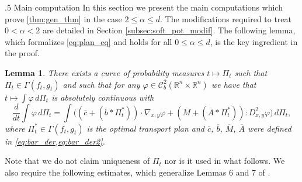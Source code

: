 \documentclass[10pt,oneside]{amsart}
\makeatletter
\def\subsection{\@startsection{subsection}{2}%
  \z@{.5\linespacing\@plus.7\linespacing}
{.5\baselineskip}%
  {\normalfont\centering\scshape}%
}
\numberwithin{equation}{section}
\numberwithin{definition}{section}
\numberwithin{theorem}{section}
\newtheorem{lemma}{Lemma}
\numberwithin{lemma}{section}
\makeatother
\begin{document}
\subsection{Main computation}\label{subsec:main_comput}
In this section we present the main computations which prove \cref{thm:gen_thm} in the case $2\leq \alpha\leq d$. The modifications required to treat $0<\alpha <2$ are detailed in Section \ref{subsec:soft_pot_modif}. The following lemma, which formalizes \cref{eq:plan_eq} and holds for all $0\leq \alpha \leq d$, is the key ingredient in the proof.
% 
\begin{lemma}\label{lem:existence_plan}
  There exists a curve of probability measures $t\mapsto \Pi_t$ such that $\Pi_t\in \Gamma(f_t,g_t)$ and such that for any $\varphi \in \mathcal C^2_b(\mathbb R^n\times \mathbb R^n)$ we have that $t\mapsto \int \varphi\,d\Pi_t$ is absolutely continuous with
  \begin{equation*}
    \frac{d}{dt}\int\varphi\,d\Pi_{t} = \int\Big(\left(\overline{c}+(\overline{b}*\Pi_{t}^{*})\right)\cdot\nabla_{x,y}\varphi 
    + \left(\overline{M}+(\overline{A}*\Pi_{t}^{*})\right):D_{x,y}^{2}\varphi\Big)\,d\Pi_{t},
  \end{equation*}
  where $\Pi^*_t\in \Gamma(f_t,g_t)$ is the optimal transport plan and $\overline c$, $\overline b$, $\overline M$, $\overline A$ were defined in \cref{eq:bar_der,eq:bar_der2}.
\end{lemma}
% 
Note that we do not claim uniqueness of $\Pi_t$ nor is it used in what follows. We also require the following estimates, which generalize Lemmas 6 and 7 of \cite{fournier2010uniqueness_Coulomb}.
\end{document}
